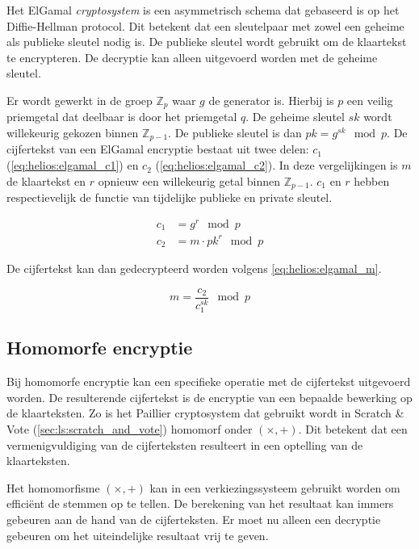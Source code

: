 Het ElGamal \textit{cryptosystem} is een asymmetrisch schema dat gebaseerd is op het Diffie-Hellman protocol. Dit betekent dat een sleutelpaar met zowel een geheime als publieke sleutel nodig is. De publieke sleutel wordt gebruikt om de klaartekst te encrypteren. De decryptie kan alleen uitgevoerd worden met de geheime sleutel.

\npar Er wordt gewerkt in de groep $\mathbb{Z}_p$ waar $g$ de generator is. Hierbij is $p$ een veilig priemgetal dat deelbaar is door het priemgetal $q$. De geheime sleutel $sk$ wordt willekeurig gekozen binnen $\mathbb{Z}_{p-1}$. De publieke sleutel is dan ${pk} = g^{sk} \mod{p}$. De cijfertekst van een ElGamal encryptie bestaat uit twee delen: $c_1$ (\ref{eq:helios:elgamal_c1}) en $c_2$ (\ref{eq:helios:elgamal_c2}). In deze vergelijkingen is $m$ de klaartekst en $r$ opnieuw een willekeurig getal binnen $\mathbb{Z}_{p-1}$. $c_1$ en $r$ hebben respectievelijk de functie van tijdelijke publieke en private sleutel.\cite{preneel_cryptography_and_network_security}

\begin{align}
  \label{eq:helios:elgamal_c1} 
  c_1 & = g^r \mod{p} \\
  \label{eq:helios:elgamal_c2}
  c_2 & = m \cdot {pk}^r \mod{p}
\end{align}

\npar De cijfertekst kan dan gedecrypteerd worden volgens \ref{eq:helios:elgamal_m}.

\begin{equation}
  \label{eq:helios:elgamal_m}
  m = \frac{c_2}{c_1^{sk}} \mod{p}
\end{equation}

\subsection{Homomorfe encryptie}
\label{sec:helios:homomorfe_encryptie}

Bij homomorfe encryptie kan een specifieke operatie met de cijfertekst uitgevoerd worden. De resulterende cijfertekst is de encryptie van een bepaalde bewerking op de klaarteksten.\cite{micciancio_a_first_glimpse_of_cryptographys_holy_grail} Zo is het Paillier cryptosystem dat gebruikt wordt in Scratch \& Vote (\ref{sec:ls:scratch_and_vote}) homomorf onder $(\times, +)$. Dit betekent dat een vermenigvuldiging van de cijferteksten resulteert in een optelling van de klaarteksten.

\npar Het homomorfisme $(\times, +)$ kan in een verkiezingssysteem gebruikt worden om effici\"ent de stemmen op te tellen. De berekening van het resultaat kan immers gebeuren aan de hand van de cijferteksten. Er moet nu alleen een decryptie gebeuren om het uiteindelijke resultaat vrij te geven.

